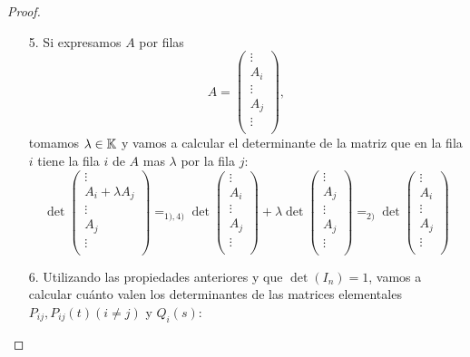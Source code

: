 \begin{proof}
\begin{enumerate}
		\item[5.] Si expresamos \(A \) por filas
			\[
				A = \left (\begin{array}{c}
						\vdots \\ \hline
						A_i    \\ \hline
						\vdots \\ \hline
						A_j    \\ \hline
						\vdots \\
					\end{array} \right ),
			\]
			tomamos \(\lambda \in  \mathbb{K} \) y vamos a calcular el determinante de la matriz que en la fila \(i \) tiene la fila \(i \) de \(A \) mas \(\lambda\) por la fila \(j \):
			\[
				\det \left (\begin{array}{c}
						\vdots            \\ \hline
						A_i + \lambda A_j \\ \hline
						\vdots            \\ \hline
						A_j               \\ \hline
						\vdots            \\
					\end{array} \right ) =_{1),4)} \det \left (\begin{array}{c}
						\vdots \\ \hline
						A_i    \\ \hline
						\vdots \\ \hline
						A_j    \\ \hline
						\vdots \\
					\end{array} \right ) + \lambda \det\left (\begin{array}{c}
						\vdots \\ \hline
						A_j    \\ \hline
						\vdots \\ \hline
						A_j    \\ \hline
						\vdots \\
					\end{array} \right ) =_{2)} \det \left (\begin{array}{c}
						\vdots \\ \hline
						A_i    \\ \hline
						\vdots \\ \hline
						A_j    \\ \hline
						\vdots \\
					\end{array} \right )
			\]
		\item[6.] Utilizando las propiedades anteriores y que \(\det(I_n) = 1 \), vamos a calcular cuánto valen los determinantes de las matrices elementales \(P_{ij}, P_{ij}(t) (i \neq j) \) y \(Q_i (s)\):

\end{enumerate}
\end{proof}
